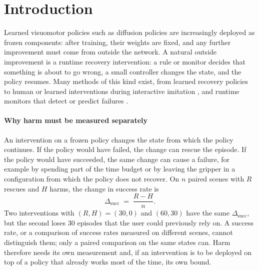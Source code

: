 \section{Introduction}\label{sec:intro}

Learned visuomotor policies such as diffusion policies \cite{chi2023diffusion} are increasingly deployed as frozen components: after training, their weights are fixed, and any further improvement must come from outside the network. A natural outside improvement is a runtime recovery intervention: a rule or monitor decides that something is about to go wrong, a small controller changes the state, and the policy resumes. Many methods of this kind exist, from learned recovery policies \cite{reichlin2022manifold,cideron2023getback,vats2025recoverychaining} to human or learned interventions during interactive imitation \cite{ross2011dagger,kelly2019hgdagger,hoque2022thrifty}, and runtime monitors that detect or predict failures \cite{agia2025unpacking,romer2025fiper,liu2023reflect,duan2025aha}.

\paragraph{Why harm must be measured separately}
An intervention on a frozen policy changes the state from which the policy continues. If the policy would have failed, the change can rescue the episode. If the policy would have succeeded, the same change can cause a failure, for example by spending part of the time budget or by leaving the gripper in a configuration from which the policy does not recover. On $n$ paired scenes with $R$ rescues and $H$ harms, the change in success rate is
\begin{equation}\label{eq:delta}
\Delta_{\mathrm{succ}} \;=\; \frac{R-H}{n}.
\end{equation}
Two interventions with $(R,H)=(30,0)$ and $(60,30)$ have the same $\Delta_{\mathrm{succ}}$, but the second loses 30 episodes that the user could previously rely on. A success rate, or a comparison of success rates measured on different scenes, cannot distinguish them; only a paired comparison on the same states can. Harm therefore needs its own measurement and, if an intervention is to be deployed on top of a policy that already works most of the time, its own bound.

